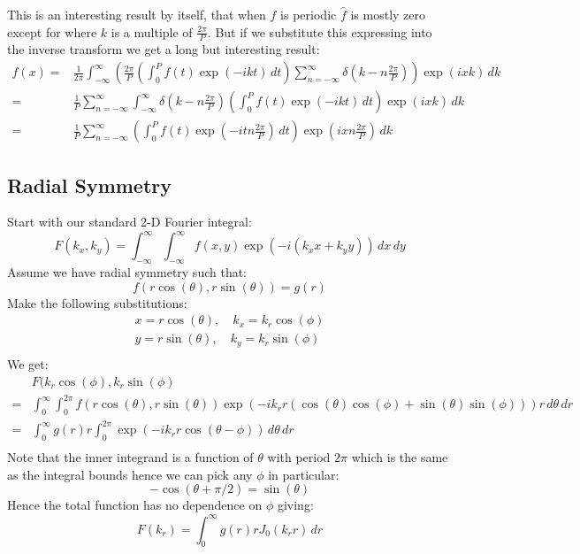 \documentclass[12pt]{report}
\begin{document}
This is an interesting result by itself, that when $f$ is periodic $\hat{f}$ is mostly zero except for where $k$ is a multiple of $\frac{2\pi}{P}$.
But if we substitute this expressing into the inverse transform we get a long but interesting result:
\begin{equation*}
\begin{aligned}
	f(x) =& \frac{1}{2\pi}\int_{-\infty}^{\infty}\left(\frac{2\pi}{P}\left(\int_{0}^{P}f(t)\exp(-ikt)\,dt\right)\sum_{n=-\infty}^{\infty}\delta\left(k-n\frac{2\pi}{P}\right)\right)\exp(ixk)\,dk\\
	      =&\frac{1}{P}\sum_{n=-\infty}^{\infty}\int_{-\infty}^{\infty}\delta\left(k-n\frac{2\pi}{P}\right)\left(\int_{0}^{P}f(t)\exp(-ikt)\,dt\right)\exp(ixk)\,dk \\
	      =&\frac{1}{P}\sum_{n=-\infty}^{\infty}\left(\int_{0}^{P}f(t)\exp(-itn\frac{2\pi}{P})\,dt\right)\exp\left(ixn\frac{2\pi}{P}\right)\,dk
\end{aligned}
\end{equation*}

\subsection{Radial Symmetry}
Start with our standard 2-D Fourier integral:
\[F(k_x,k_y) = \int_{-\infty}^{\infty}\int_{-\infty}^{\infty}f(x,y)\exp(-i(k_x x + k_y y))\,dx\,dy\]
Assume we have radial symmetry such that:
\[f(r\cos(\theta),r\sin(\theta)) = g(r)\]
Make the following substitutions:
\begin{equation*}
\begin{aligned}
	x = r\cos(\theta),\quad k_x = k_r\cos(\phi) \\
	y = r\sin(\theta),\quad k_y = k_r\sin(\phi)\\
\end{aligned}
\end{equation*}
We get:
\begin{equation*}
\begin{aligned}
	&F(k_r\cos(\phi),k_r\sin(\phi)  \\
	=& \int_0^\infty\int_0^{2\pi}f(r\cos(\theta),r\sin(\theta))\exp(-ik_r r(\cos(\theta)\cos(\phi)+\sin(\theta)\sin(\phi)))r\,d\theta\,dr\\
	=& \int_0^\infty g(r)r\int_0^{2\pi}\exp(-ik_r r\cos(\theta-\phi))\,d\theta\,dr \\
\end{aligned}
\end{equation*}
Note that the inner integrand is a function of $\theta$ with period $2\pi$ which is the same as the integral bounds hence we can pick any $\phi$ in particular:
\[-\cos(\theta +\pi/2) = \sin(\theta)\]
Hence the total function has no dependence on $\phi$ giving:
\[F(k_r) = \int_0^\infty g(r)rJ_0(k_r r)\,dr\]
\end{document}
